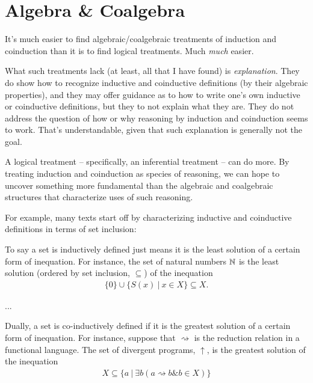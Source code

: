 \section{Algebra \& Coalgebra}\label{sec:coalgebra}

It's much easier to find algebraic/coalgebraic treatments of induction
and coinduction than it is to find logical treatments. Much
\textit{much} easier.

What such treatments lack (at least, all that I have found) is
\textit{explanation}. They do show how to recognize inductive and
coinductive definitions (by their algebraic properties), and they may
offer guidance as to how to write one's own inductive or coinductive
definitions, but they to not explain what they are. They do not
address the question of how or why reasoning by induction and
coinduction seems to work. That's understandable, given that such
explanation is generally not the goal.

A logical treatment -- specifically, an inferential treatment -- can
do more. By treating induction and coinduction as species of
reasoning, we can hope to uncover something more fundamental than the
algebraic and coalgebraic structures that characterize uses of such
reasoning.

For example, many texts start off by characterizing inductive and
coinductive definitions in terms of set inclusion:

\begin{displayquote}
  To say a set is inductively defined just means it is the least
  solution of a certain form of inequation. For instance, the set of
  natural numbers \(\mathbb{N}\) is the least solution (ordered by set
  inclusion, \(\subseteq\)) of the inequation
  \begin{align}
    \{0\} \cup \{S(x)\ |\  x\in X\} \subseteq X.
  \end{align}

  ...

  Dually, a set is co-inductively defined if it is the greatest
  solution of a certain form of inequation. For instance, suppose that
  \(\rightsquigarrow\) is the reduction relation in a functional
  language. The set of divergent programs, \(\uparrow\), is the
  greatest solution of the inequation
  \begin{align}
    X \subseteq \{a\ |\ \exists b(a\rightsquigarrow b \& b\in X)\}
  \end{align}
\end{displayquote}

